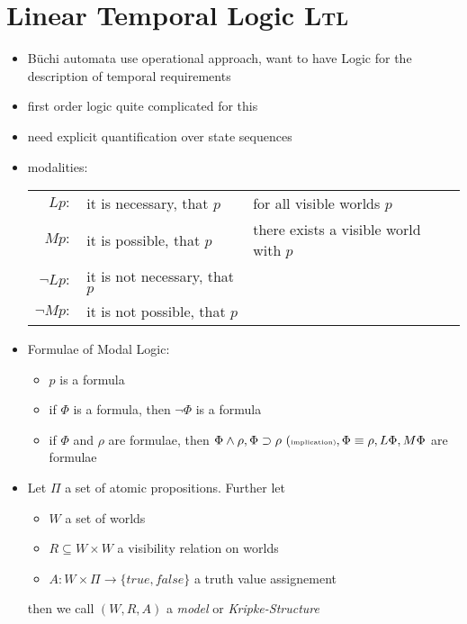 \documentclass[a4paper, 10pt]{article}
\begin{document}
\section*{Linear Temporal Logic \textsc{Ltl}}
\begin{itemize}
    \item Büchi automata use operational approach, want to have Logic for the description of temporal requirements
    \item first order logic quite complicated for this
    \item[\follows] need explicit quantification over state sequences
    \item modalities:
    \begin{tabular}[t]{rll}
    $Lp:$ & it is necessary, that $p$ & {\tiny for all visible worlds $p$}\\
    $Mp:$ & it is possible, that $p$ & {\tiny there exists a visible world with $p$}\\
    $\neg Lp:$ & it is not necessary, that $p$ & %
    \\
    $\neg Mp:$ & it is not possible, that $p$ & %
    \end{tabular}
    \item Formulae of Modal Logic:
    \begin{itemize}
        \item $p$ is a formula
        \item if $\Phi$ is a formula, then $\neg\Phi$ is a formula
        \item if $\Phi$ and $\rho$ are formulae, then $\Phi\wedge\rho, \Phi\supset\rho \textrm{ (\tiny implication)}, \Phi\equiv\rho, L\Phi, M\Phi$ are formulae
    \end{itemize}
    \item \begin{shaded}
        Let $\Pi$ a set of atomic propositions. Further let
        \begin{itemize}
            \item $W$ a set of worlds
            \item $R\subseteq W\times W$ a visibility relation on worlds
            \item $A: W\times\Pi\to \{true,false\}$ a truth value assignement
        \end{itemize}
        then we call $(W,R,A)$ a \emph{model} or \emph{Kripke-Structure}
    \end{shaded}
\end{itemize}
\end{document}

